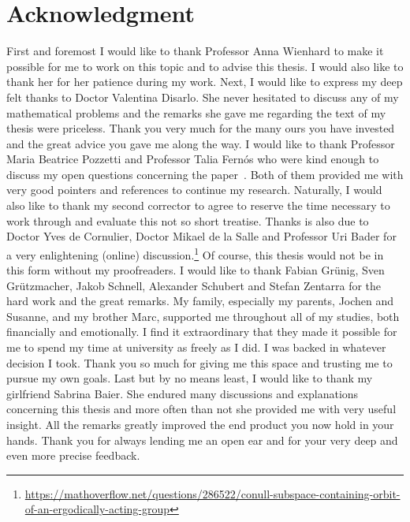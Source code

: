 \clearpage
{}
\markleft{}
\pagestyle{useheadings}
\section*{Acknowledgment}
%
\label{sec:acknowledgement}

First and foremost I would like to thank Professor Anna Wienhard to make it possible for me to work on this topic and to advise this thesis. I would also like to thank her for her patience during my work. Next, I would like to express my deep felt thanks to Doctor Valentina Disarlo. She never hesitated to discuss any of my mathematical problems and the remarks she gave me regarding the text of my thesis were priceless. Thank you very much for the many ours you have invested and the great advice you gave me along the way.
I would like to thank Professor Maria Beatrice Pozzetti and Professor Talia Fernós who were kind enough to discuss my open questions concerning the paper~\cite{MR3509968}. Both of them provided me with very good pointers and references to continue my research. Naturally, I would also like to thank my second corrector to agree to reserve the time necessary to work through and evaluate this not so short treatise.
Thanks is also due to Doctor Yves de Cornulier, Doctor Mikael de la Salle and Professor Uri Bader for a very enlightening (online) discussion.\footnote{\url{https://mathoverflow.net/questions/286522/conull-subspace-containing-orbit-of-an-ergodically-acting-group}} 
Of course, this thesis would not be in this form without my proofreaders. I would like to thank Fabian Grünig, Sven Grützmacher, Jakob Schnell, Alexander Schubert and Stefan Zentarra for the hard work and the great remarks.
My family, especially my parents, Jochen and Susanne, and my brother Marc, supported me throughout all of my studies, both financially and emotionally. I find it extraordinary that they made it possible for me to spend my time at university as freely as I did. I was backed in whatever decision I took. Thank you so much for giving me this space and trusting me to pursue my own goals.
Last but by no means least, I would like to thank my girlfriend Sabrina Baier. She endured many discussions and explanations concerning this thesis and more often than not she provided me with very useful insight. All the remarks greatly improved the end product you now hold in your hands. Thank you for always lending me an open ear and for your very deep and even more precise feedback.

\clearpage
\pagestyle{useheadings}

